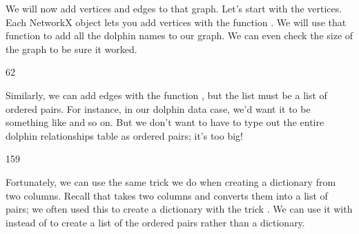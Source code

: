 \documentclass[letterpaper,10pt,english]{jupyterBook}
\begin{document}
\begin{sphinxVerbatim}[commandchars=\\\{\}]
  
\end{sphinxVerbatim}

\sphinxAtStartPar
We will now add vertices and edges to that graph.  Let’s start with the vertices.  Each NetworkX  object lets you add vertices with the function .  We will use that function to add all the dolphin names to our graph.  We can even check the size of the graph to be sure it worked.

\begin{sphinxVerbatim}[commandchars=\\\{\}]
    
                        
\end{sphinxVerbatim}

\begin{sphinxVerbatim}[commandchars=\\\{\}]
62
\end{sphinxVerbatim}

\sphinxAtStartPar
Similarly, we can add edges with the function , but the list must be a list of ordered pairs.  For instance, in our dolphin data case, we’d want it to be something like  and so on.  But we don’t want to have to type out the entire dolphin relationships table as ordered pairs; it’s too big!

\begin{sphinxVerbatim}[commandchars=\\\{\}]
  
\end{sphinxVerbatim}

\begin{sphinxVerbatim}[commandchars=\\\{\}]
159
\end{sphinxVerbatim}

\sphinxAtStartPar
Fortunately, we can use the same trick we do when creating a dictionary from two columns.  Recall that  takes two columns and converts them into a list of pairs; we often used this to create a dictionary with the trick .  We can use it with  instead of  to create a list of the ordered pairs rather than a dictionary.
\end{document}
